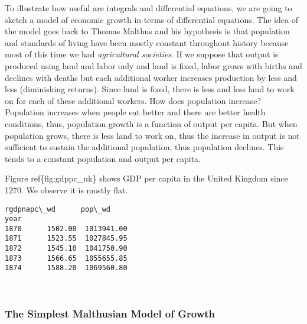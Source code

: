 \documentclass[11pt]{article}
\newcommand{\prompt}[4]{
        \llap{{\color{#2}[#3]: #4}}\vspace{-1.25em}
    }
\begin{document}
To illustrate how useful are integrals and differential equations, we
are going to sketch a model of economic growth in terms of differential
equations. The idea of the model goes back to Thomas Malthus and his
hypothesis is that population and standards of living have been mostly
constant throughout history because most of this time we had
\emph{agricultural societies}. If we suppose that output is produced
using land and labor only and land is fixed, labor grows with births and
declines with deaths but each additional worker increases production by
less and less (diminishing returns). Since land is fixed, there is less
and less land to work on for each of these additional workers. How does
population increase? Population increases when people eat better and
there are better health conditions, thus, population growth is a
function of output per capita. But when population grows, there is less
land to work on, thus the increase in output is not sufficient to
sustain the additional population, thus population declines. This tends
to a constant population and output per capita.

Figure ref\{fig:gdppc\_uk\} shows GDP per capita in the United Kingdom
since 1270. We observe it is mostly flat.

            \begin{tcolorbox}[breakable, boxrule=.5pt, size=fbox, pad at break*=1mm, opacityfill=0]
\prompt{Out}{outcolor}{13}{\hspace{3.5pt}}
\begin{Verbatim}[commandchars=\\\{\}]
      rgdpnapc\_wd      pop\_wd
year
1870      1502.00  1013941.00
1871      1523.55  1027845.95
1872      1545.10  1041750.90
1873      1566.65  1055655.85
1874      1588.20  1069560.80
\end{Verbatim}
\end{tcolorbox}
        
    \begin{center}
    \end{center}
    { \hspace*{\fill} \\}
    
    \hypertarget{the-simplest-malthusian-model-of-growth}{%
\subsubsection{The Simplest Malthusian Model of
Growth}\label{the-simplest-malthusian-model-of-growth}}
\end{document}
